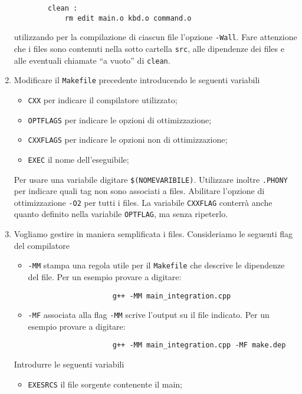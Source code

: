 \begin{enumerate}
\begin{verbatim}
        clean :
            rm edit main.o kbd.o command.o
    \end{verbatim}
    utilizzando per la compilazione di ciascun file l'opzione \texttt{-Wall}. Fare attenzione che i files sono contenuti nella sotto cartella \texttt{src}, alle dipendenze dei files e alle eventuali chiamate ``a vuoto'' di \texttt{clean}.
    \item Modificare il \texttt{Makefile} precedente introducendo le seguenti variabili
        \begin{itemize}
            \item \texttt{CXX} per indicare il compilatore utilizzato;
            \item \texttt{OPTFLAGS} per indicare le opzioni di ottimizzazione;
            \item \texttt{CXXFLAGS} per indicare le opzioni non di ottimizzazione;
            \item \texttt{EXEC} il nome dell'eseguibile;
        \end{itemize}
        Per usare una variabile digitare \texttt{\$(NOMEVARIBILE)}. Utilizzare inoltre \texttt{.PHONY} per indicare quali tag non sono associati a files. Abilitare l'opzione di ottimizzazione \texttt{-O2} per tutti i files. La variabile \texttt{CXXFLAG} conterr\`a anche quanto definito nella variabile \texttt{OPTFLAG}, ma senza ripeterlo.
        \item Vogliamo gestire in maniera semplificata i files. Consideriamo le seguenti flag del compilatore
            \begin{itemize}
                \item \texttt{-MM} stampa una regola utile per il \texttt{Makefile} che descrive le dipendenze del file. Per un esempio provare a digitare:
                \begin{verbatim}
                    g++ -MM main_integration.cpp
                \end{verbatim}
                \item \texttt{-MF} associata alla flag \texttt{-MM} scrive l'output su il file indicato. Per un esempio provare a digitare:
                \begin{verbatim}
                    g++ -MM main_integration.cpp -MF make.dep
                \end{verbatim}
            \end{itemize}
            Introdurre le seguenti variabili
            \begin{itemize}
                \item \texttt{EXESRCS} il file sorgente contenente il main;

\end{itemize}
\end{enumerate}
